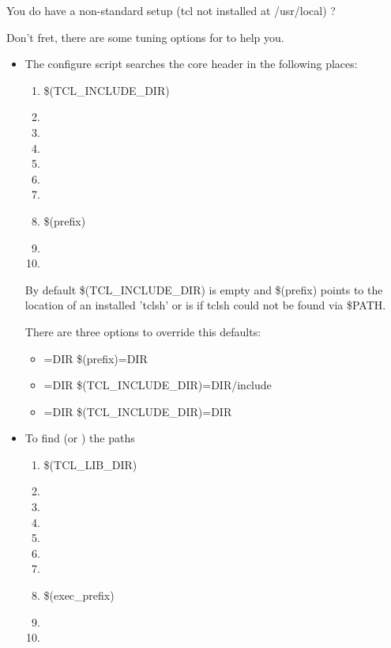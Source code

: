 \documentclass {report}
\begin{document}
You do have a non-standard setup (tcl not installed at \file
{/usr/local}) ?

Don't fret, there are some tuning options for  to help
you. 

\begin {itemize}
\item	The configure script searches the core header  in
	the following places:

	\begin {enumerate}
	\item	\$(TCL\_INCLUDE\_DIR)
	\item	{}
	\item	{}
	\item	{}
	\item	{}
	\item	{}
	\item	{}
	\item	\$(prefix)
	\item	{}
	\item	{}
	\end {enumerate}

	By default \$(TCL\_INCLUDE\_DIR) is empty and \$(prefix) points
	to the location of an installed 'tclsh' or is  if
	tclsh could not be found via \$PATH.

	There are three options to override this defaults:

	\begin {itemize}
	\item[]	=DIR		   \ra {} \$(prefix)=DIR
	\item[]	=DIR		   \ra {} \$(TCL\_INCLUDE\_DIR)=DIR/include
	\item[]	=DIR  \ra {} \$(TCL\_INCLUDE\_DIR)=DIR
	\end {itemize}


\item	To find  (or ) the paths

	\begin {enumerate}
	\item	\$(TCL\_LIB\_DIR)
	\item	{}
	\item	{}
	\item	{}
	\item	{}
	\item	{}
	\item	{}
	\item	\$(exec\_prefix)
	\item	{}
	\item	{}
	\end {enumerate}


\end{itemize}
\end{document}
